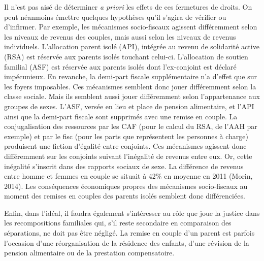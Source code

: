 \documentclass[
  12pt,
]{book}
\begin{document}
Il n'est pas aisé de déterminer \emph{a priori} les effets de ces
fermetures de droits. On peut néanmoins émettre quelques hypothèses
qu'il s'agira de vérifier ou d'infirmer. Par exemple, les mécanismes
socio-fiscaux agissent différemment selon les niveaux de revenus des
couples, mais aussi selon les niveaux de revenus individuels.
L'allocation parent isolé (API), intégrée au revenu de solidarité active
(RSA) est réservée aux parents isolés touchant celui-ci. L'allocation de
soutien familial (ASF) est réservée aux parents isolés dont
l'ex-conjoint est déclaré impécunieux. En revanche, la demi-part fiscale
supplémentaire n'a d'effet que sur les foyers imposables. Ces mécanismes
semblent donc jouer différemment selon la classe sociale. Mais ils
semblent aussi jouer différemment selon l'appartenance aux groupes de
sexes. L'ASF, versée en lieu et place de pension alimentaire, et l'API
ainsi que la demi-part fiscale sont supprimés avec une remise en couple.
La conjugalisation des ressources par les CAF (pour le calcul du RSA, de
l'AAH par exemple) et par le fisc (pour les parts que représentent les
personnes à charge) produisent une fiction d'égalité entre conjoints.
Ces mécanismes agissent donc différemment sur les conjoints suivant
l'inégalité de revenus entre eux. Or, cette inégalité s'inscrit dans des
rapports sociaux de sexe. La différence de revenus entre homme et femmes
en couple se situait à 42\% en moyenne en 2011 (Morin, 2014). Les
conséquences économiques propres des mécanismes socio-fiscaux au moment
des remises en couples des parents isolés semblent donc différenciées.

Enfin, dans l'idéal, il faudra également s'intéresser au rôle que joue
la justice dans les recompositions familiales qui, s'il reste secondaire
en comparaison des séparations, ne doit pas être négligé. La remise en
couple d'un parent est parfois l'occasion d'une réorganisation de la
résidence des enfants, d'une révision de la pension alimentaire ou de la
prestation compensatoire.
\end{document}
